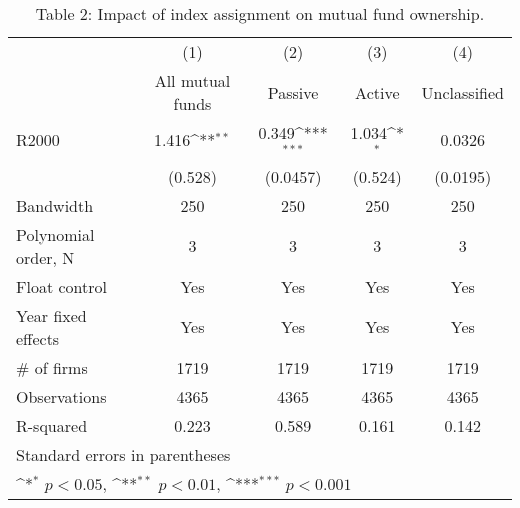 \begin{table}[htbp]\centering
\def\sym#1{\ifmmode^{#1}\else\(^{#1}\)\fi}
\caption{Table 2: Impact of index assignment on mutual fund ownership.}
\begin{tabular}{l*{4}{c}}
\hline\hline
                    &\multicolumn{1}{c}{(1)}&\multicolumn{1}{c}{(2)}&\multicolumn{1}{c}{(3)}&\multicolumn{1}{c}{(4)}\\
                    &\multicolumn{1}{c}{All mutual funds}&\multicolumn{1}{c}{Passive}&\multicolumn{1}{c}{Active}&\multicolumn{1}{c}{Unclassified}\\
\hline
R2000               &       1.416\sym{**} &       0.349\sym{***}&       1.034\sym{*}  &      0.0326         \\
                    &     (0.528)         &    (0.0457)         &     (0.524)         &    (0.0195)         \\
\hline
Bandwidth           &         250         &         250         &         250         &         250         \\
Polynomial order, N &           3         &           3         &           3         &           3         \\
Float control       &         Yes         &         Yes         &         Yes         &         Yes         \\
Year fixed effects  &         Yes         &         Yes         &         Yes         &         Yes         \\
# of firms          &        1719         &        1719         &        1719         &        1719         \\
Observations        &        4365         &        4365         &        4365         &        4365         \\
R-squared           &       0.223         &       0.589         &       0.161         &       0.142         \\
\hline\hline
\multicolumn{5}{l}{\footnotesize Standard errors in parentheses}\\
\multicolumn{5}{l}{\footnotesize \sym{*} \(p<0.05\), \sym{**} \(p<0.01\), \sym{***} \(p<0.001\)}\\
\end{tabular}
\end{table}
